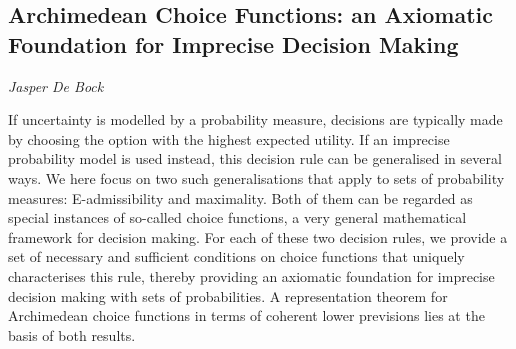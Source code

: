 \documentclass[../booklet.tex]{subfiles}
\begin{document}
\subsection[Archimedean Choice Functions: an Axiomatic Foundation for Imprecise Decision Making. {\it Jasper De Bock}]{Archimedean Choice Functions: an Axiomatic Foundation for Imprecise Decision Making}

\begin{center}
  {\it Jasper De Bock}
\end{center}



If uncertainty is modelled by a probability measure, decisions are typically made by choosing the option with the highest expected utility. If an imprecise probability model is used instead, this decision rule can be generalised in several ways. We here focus on two such generalisations that apply to sets of probability measures: E-admissibility and maximality. Both of them can be regarded as special instances of so-called choice functions, a very general mathematical framework for decision making. For each of these two decision rules, we provide a set of necessary and sufficient conditions on choice functions that uniquely characterises this rule, thereby providing an axiomatic foundation for imprecise decision making with sets of probabilities. A representation theorem for Archimedean choice functions in terms of coherent lower previsions lies at the basis of both results.

\end{document}
